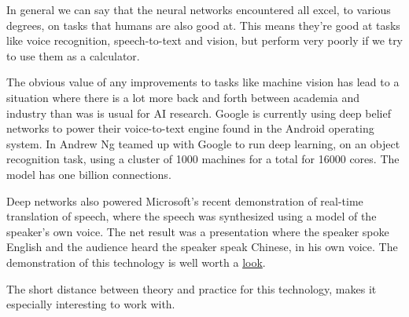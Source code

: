 \documentclass[11pt]{article}
\begin{document}
In general we can say that the neural networks encountered all excel, to various degrees, on tasks that humans are also good at.  This means they're good at tasks like voice recognition, speech-to-text and vision, but perform very poorly if we try to use them as a calculator.

The obvious value of any improvements to tasks like machine vision has lead to a situation where there is a lot more back and forth between academia and industry than was is usual for AI research.  Google is currently using deep belief networks to power their voice-to-text engine found in the Android operating system.  In \cite{ng} Andrew Ng teamed up with Google to run deep learning, on an object recognition task, using a cluster of 1000 machines for a total for 16000 cores.  The model has one billion connections.

Deep networks also powered Microsoft's recent demonstration of real-time translation of speech, where the speech was synthesized using a model of the speaker's own voice.  The net result was a presentation where the speaker spoke English and the audience heard the speaker speak Chinese, in his own voice.  The demonstration of this technology is well worth a \href{http://www.youtube.com/watch?v=Nu-nlQqFCKg}{look}.

The short distance between theory and practice for this technology, makes it especially interesting to work with.



\end{document}
